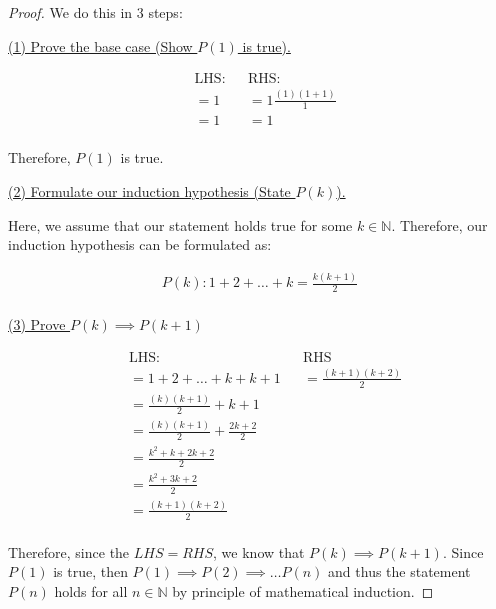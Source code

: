 \documentclass{article}
\begin{document}
\begin{proof}

We do this in 3 steps: \\

\begin{center}
	\large{\underline{(1) Prove the base case (Show $P(1)$ is true).}}
\end{center}

\vspace{.3cm}

\begin{align*}
	&\text{LHS:}& &\text{RHS:} \\
	&=1 & &=1\frac{(1)(1 + 1)}{1} \\
	&=1 & &=1 \\
\end{align*}

Therefore, $P(1)$ is true. \\

\begin{center}
	\large{\underline{(2) Formulate our induction hypothesis (State $P(k)$).}}
\end{center}

\vspace{.3cm}

Here, we assume that our statement holds true for some $k \in \mathbb{N}$. Therefore, our induction hypothesis can be formulated as:

\begin{align*}
	P(k): 1 + 2 + \ldots + k = \frac{k(k + 1)}{2} \\
\end{align*}

\begin{center}
	\large{\underline{(3) Prove $P(k) \implies P(k + 1)$}} \\
\end{center}

\vspace{.3cm}

\begin{align*}
	&\text{LHS:}& &\text{RHS} \\
	&= 1 + 2 + \ldots + k + k + 1& &=\frac{(k + 1)(k + 2)}{2} \\
	&= \frac{(k)(k + 1)}{2} + k + 1& & \\
	&= \frac{(k)(k + 1)}{2} + \frac{2k + 2}{2}& & \\
	&= \frac{k^2 + k + 2k + 2}{2}& & \\
	&= \frac{k^2 + 3k + 2}{2}& & \\
	&= \frac{(k + 1)(k + 2)}{2}& & \\
\end{align*}

Therefore, since the $LHS = RHS$, we know that $P(k) \implies P(k + 1)$. Since $P(1)$ is true, then $P(1) \implies P(2) \implies \ldots P(n)$ and thus the statement $P(n)$ holds for all $n \in \mathbb{N}$ by principle of mathematical induction.

\end{proof}
\end{document}
